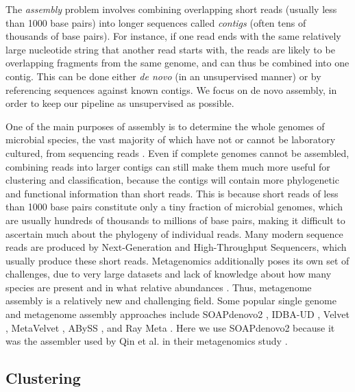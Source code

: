 The \emph{assembly} problem involves combining overlapping short reads (usually less than 1000 base pairs) into longer sequences called \emph{contigs} (often tens of thousands of base pairs). For instance, if one read ends with the same relatively large nucleotide string that another read starts with, the reads are likely to be overlapping fragments from the same genome, and can thus be combined into one contig. This can be done either \emph{de novo} (in an unsupervised manner) or by referencing sequences against known contigs. We focus on de novo assembly, in order to keep our pipeline as unsupervised as possible. 

One of the main purposes of assembly is to determine the whole genomes of microbial species, the vast majority of which have not or cannot be laboratory cultured, from sequencing reads \cite{zerbino08}. Even if complete genomes cannot be assembled, combining reads into larger contigs can still make them much more useful for clustering and classification, because the contigs will contain more phylogenetic and functional information than short reads. This is because short reads of less than 1000 base pairs constitute only a tiny fraction of microbial genomes, which are usually hundreds of thousands to millions of base pairs, making it difficult to ascertain much about the phylogeny of individual reads. Many modern sequence reads are produced by Next-Generation and High-Throughput Sequencers, which usually produce these short reads. Metagenomics additionally poses its own set of challenges, due to very large datasets and lack of knowledge about how many species are present and in what relative abundances \cite{namiki12}. Thus, metagenome assembly is a relatively new and challenging field. Some popular single genome and metagenome assembly approaches include SOAPdenovo2 \cite{luo12}, IDBA-UD \cite{peng12}, Velvet \cite{zerbino08}, MetaVelvet \cite{namiki12}, ABySS \cite{simpson09}, and Ray Meta \cite{boisvert12}. Here we use SOAPdenovo2 because it was the assembler used by Qin et al. in their metagenomics study \cite{qin041012}.

\subsection{Clustering}



